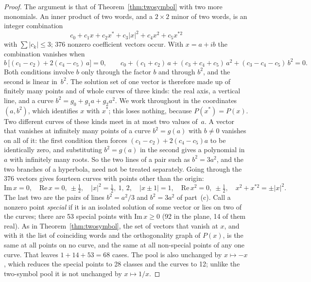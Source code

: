 \begin{proof}
The argument is that of Theorem~\ref{thm:twosymbol} with two more monomials.  An inner product of
two words, and a $2\times2$ minor of two words, is an integer combination
\[
c_0+c_1x+c_2x^{*}+c_3|x|^2+c_4x^2+c_5x^{*2}
\]
with $\sum|c_k|\le3$; 376 nonzero coefficient vectors occur.  With $x=a+ib$ the combination
vanishes when
\[
b\,\bigl[(c_1-c_2)+2(c_4-c_5)\,a\bigr]=0,\qquad
c_0+(c_1+c_2)\,a+(c_3+c_4+c_5)\,a^2+(c_3-c_4-c_5)\,b^2=0 .
\]
Both conditions involve $b$ only through the factor $b$ and through $b^2$, and the second is
linear in~$b^2$.  The solution set of one vector is therefore made up of finitely many points
and of whole curves of three kinds: the real axis, a vertical line, and a curve
$b^2=g_0+g_1a+g_2a^2$.  We work throughout in the coordinates $(a,b^2)$, which identifies $x$
with $x^{*}$; this loses nothing, because $P(x^{*})=P(x)$.  Two different curves of these kinds
meet in at most two values of~$a$.  A vector that vanishes at infinitely many points of a curve
$b^2=g(a)$ with $b\ne0$ vanishes on all of it: the first condition then forces
$(c_1-c_2)+2(c_4-c_5)a$ to be identically zero, and substituting $b^2=g(a)$ in the second
gives a polynomial in $a$ with infinitely many roots.  So the two lines of a pair such as
$b^2=3a^2$, and the two branches of a hyperbola, need not be treated separately.
Going through the 376 vectors gives fourteen curves with points other than the origin:
\[
\mathrm{Im}\,x=0,\quad \mathrm{Re}\,x=0,\ \pm\tfrac12,\quad |x|^2=\tfrac12,\ 1,\ 2,\quad
|x\pm1|=1,\quad \mathrm{Re}\,x^2=0,\ \pm\tfrac12,\quad x^2+x^{*2}=\pm|x|^2 .
\]
The last two are the pairs of lines $b^2=a^2/3$ and $b^2=3a^2$ of part~(c).  Call a nonzero point
\emph{special} if it is an isolated solution of some vector or lies on two of the curves; there
are 53 special points with $\mathrm{Im}\,x\ge0$ (92 in the plane, 14 of them real).  As in Theorem~\ref{thm:twosymbol}, the set of vectors that vanish at $x$,
and with it the list of coinciding words and the orthogonality graph of $P(x)$, is the same at
all points on no curve, and the same at all non-special points of any one curve.  That leaves
$1+14+53=68$ cases.  The pool is also unchanged by $x\mapsto-x$, which reduces
the special points to 28 classes and the curves to 12; unlike the two-symbol pool it is not
unchanged by $x\mapsto1/x$.


\end{proof}
